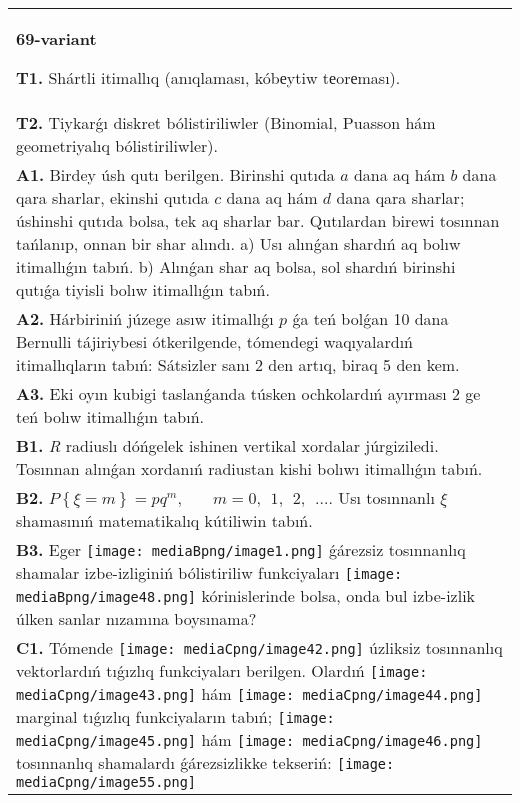 \documentclass{article}
\begin{document}
\begin{tabular}{m{17cm}}
\textbf{69-variant}
\newline

\textbf{T1.} Shártli itimallıq (anıqlaması, kóbеytiw tеorеması).
 \\
\textbf{T2.} Tiykarǵı diskret bólistiriliwler (Binomial, Puasson hám geometriyalıq bólistiriliwler).
 \\
\textbf{A1.} Birdey úsh qutı berilgen. Birinshi qutıda $a$ dana aq hám $b$ dana qara sharlar, ekinshi qutıda $c$ dana aq hám $d$ dana qara sharlar; úshinshi qutıda bolsa, tek aq sharlar bar. Qutılardan birewi tosınnan tańlanıp, onnan bir shar alındı. a) Usı alınǵan shardıń aq bolıw itimallıǵın tabıń. b) Alınǵan shar aq bolsa, sol shardıń birinshi qutıǵa tiyisli bolıw itimallıǵın tabıń.
 \\
\textbf{A2.} Hárbiriniń júzege asıw itimallıǵı $p$ ǵa teń bolǵan 10 dana Bernulli tájiriybesi ótkerilgende, tómendegi waqıyalardıń itimallıqların tabıń: Sátsizler sanı 2 den artıq, biraq 5 den kem.
 \\
\textbf{A3.} Eki oyın kubigi taslanǵanda túsken ochkolardıń ayırması 2 ge teń bolıw itimallıǵın tabıń.
 \\
\textbf{B1.} \emph{R} radiuslı dóńgelek ishinen vertikal xordalar júrgiziledi. Tosınnan alınǵan xordanıń radiustan kishi bolıwı itimallıǵın tabıń.
 \\
\textbf{B2.} \(P\left\{ \xi = m \right\} = pq^{m},\ \ \ \ \ \ \ \ m = 0,\ \ 1,\ \ 2,\ \ \ldots\). Usı tosınnanlı $\xi$ shamasınıń matematikalıq kútiliwin tabıń.
 \\
\textbf{B3.} Eger \texttt{[image: mediaBpng/image1.png]} ǵárezsiz tosınnanlıq shamalar izbe-izliginiń bólistiriliw funkciyaları
\texttt{[image: mediaBpng/image48.png]}
kórinislerinde bolsa, onda bul izbe-izlik úlken sanlar nızamına boysınama?
 \\
\textbf{C1.} Tómende \texttt{[image: mediaCpng/image42.png]} úzliksiz tosınnanlıq vektorlardıń tıǵızlıq funkciyaları berilgen. Olardıń \texttt{[image: mediaCpng/image43.png]} hám \texttt{[image: mediaCpng/image44.png]} marginal tıǵızlıq funkciyaların tabıń; \texttt{[image: mediaCpng/image45.png]} hám \texttt{[image: mediaCpng/image46.png]} tosınnanlıq shamalardı ǵárezsizlikke tekseriń: \texttt{[image: mediaCpng/image55.png]}

\end{tabular}
\end{document}
